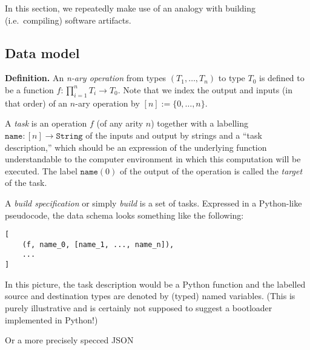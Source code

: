 In this section, we repeatedly make use of an analogy with building
(i.e.~compiling) software artifacts.

\hypertarget{data-model}{%
\subsection{Data model}\label{data-model}}

\textbf{Definition.} An \emph{n-ary operation} from types
\((T_1,\ldots,T_n)\) to type \(T_0\) is defined to be a function
\(f:\prod_{i=1}^n T_i \rightarrow T_0\). Note that we index the output
and inputs (in that order) of an \(n\)-ary operation by
\([n]:=\{0,\ldots,n\}\).

A \emph{task} is an operation \(f\) (of any arity \(n\)) together with a
labelling \(\mathtt{name}:[n]\rightarrow \mathtt{String}\) of the inputs
and output by strings and a ``task description,'' which should be an
expression of the underlying function understandable to the computer
environment in which this computation will be executed. The label
\(\mathtt{name}(0)\) of the output of the operation is called the
\emph{target} of the task.

A \emph{build specification} or simply \emph{build} is a set of tasks.
Expressed in a Python-like pseudocode, the data schema looks something
like the following:

\begin{verbatim}
[
    (f, name_0, [name_1, ..., name_n]),
    ...
]
\end{verbatim}

In this picture, the task description would be a Python function and the
labelled source and destination types are denoted by (typed) named
variables. (This is purely illustrative and is certainly not supposed to
suggest a bootloader implemented in Python!)

Or a more precisely specced JSON

\begin{Shaded}
\begin{Highlighting}[]
\OtherTok{[}
    \FunctionTok{\{}
        \FunctionTok{:} \FunctionTok{\{}\FunctionTok{:} \FunctionTok{,} \FunctionTok{:} \FunctionTok{\},}
        \FunctionTok{:} \OtherTok{[}
            \FunctionTok{\{}\FunctionTok{:} \FunctionTok{,} \FunctionTok{:} \FunctionTok{\}}\OtherTok{,}
            \OtherTok{,}
            \FunctionTok{\{}\FunctionTok{:} \FunctionTok{,} \FunctionTok{:} \FunctionTok{\}}\OtherTok{,}
        \OtherTok{]}\FunctionTok{,}
        \FunctionTok{:} 
    \FunctionTok{\}}\OtherTok{,}
\OtherTok{]}
\end{Highlighting}
\end{Shaded}

